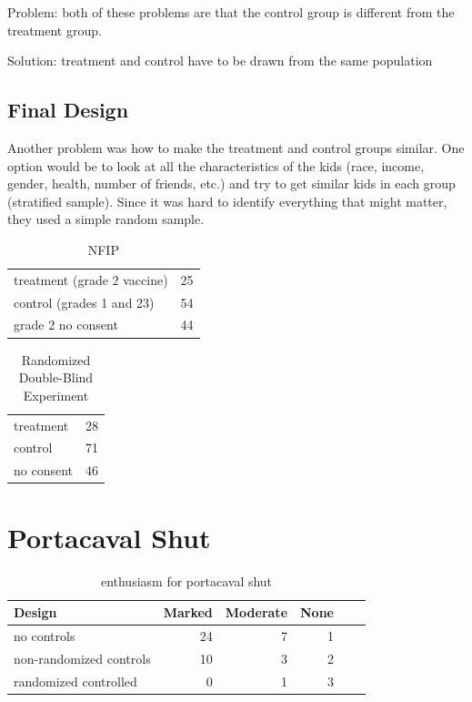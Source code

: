\documentclass[landscape]{exam}
\begin{document}
  Problem: both of these problems are that the control group is different from the
  treatment group.

  Solution: treatment and control have to be drawn from the same population

  \subsection{Final Design}
  Another problem was how to make the treatment and control groups similar.  One
  option would be to look at all the characteristics of the kids (race, income,
  gender, health, number of friends, etc.) and try to get similar kids in each
  group (stratified sample).  Since it was hard to identify everything that
  might matter, they used a simple random sample.

  \begin{table}
    \centering
    \begin{tabular}{lr}
      \toprule
      treatment (grade 2 vaccine) & 25 \\
      control (grades 1 and 23)   & 54 \\
      grade 2 no consent          & 44 \\
      \bottomrule
    \end{tabular}
    \caption{NFIP}
    \label{tab:polio.1}
  \end{table}

  \begin{table}
    \centering
    \begin{tabular}{lr}
      \toprule
      treatment  & 28 \\
      control    & 71 \\
      no consent & 46 \\
      \bottomrule
    \end{tabular}
    \caption{Randomized Double-Blind Experiment}
    \label{tab:polio.1}
  \end{table}


  \section{Portacaval Shut}
  \begin{table}
    \centering
    \begin{tabular}{lrrrrr}
      \toprule
      Design                  & Marked & Moderate & None \\
      \midrule
      no controls             & 24     & 7        & 1   \\
      non-randomized controls & 10     & 3        & 2   \\
      randomized controlled   & 0      & 1        & 3   \\
      \bottomrule
    \end{tabular}
    \caption{enthusiasm for portacaval shut}
    \label{tab:shunt}
  \end{table}
\end{document}
